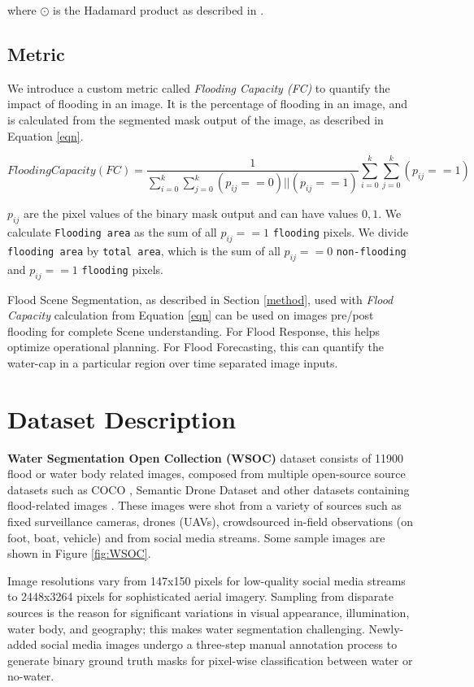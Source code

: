 \documentclass{article}
\begin{document}
where $\odot$ is the Hadamard product as described in \cite{zhang2021transfuse}.  

\subsection{Metric}
We introduce a custom metric called \textit{Flooding Capacity (FC)} to quantify the impact of flooding in an image. It is the percentage of flooding in an image, and is calculated from the segmented mask output of the image, as described in Equation \ref{eqn}. 

\begin{equation}
Flooding Capacity (FC) =\frac{1}{\sum_{i=0}^{k} \sum_{j=0}^{k} (p_{i j}==0) || (p_{ij}==1)} \sum_{i=0}^{k} \sum_{j=0}^{k} (p_{i j}==1)
\label{eqn}
\end{equation}

$ p_{ij}$ are the pixel values of the binary mask output and can have values ${0,1}$. We calculate \verb|Flooding area| as the sum of all $ p_{ij} == 1$ \verb|flooding| pixels. We divide \verb|flooding area| by \verb|total area|, which is the sum of all $ p_{ij} == 0 $ \verb|non-flooding| and $ p_{ij} == 1 $ \verb|flooding| pixels. 

Flood Scene Segmentation, as described in Section \ref{method}, used with \textit{Flood Capacity} calculation from Equation \ref{eqn} can be used on images pre/post flooding for complete Scene understanding. For Flood Response, this helps optimize operational planning. For Flood Forecasting, this can quantify the water-cap in a particular region over time separated image inputs.



\section{Dataset Description}
\textbf{Water Segmentation Open Collection (WSOC)} dataset \cite{wsoc} consists of 11900 flood or water body related images, composed from multiple open-source source datasets such as COCO \cite{coco}, Semantic Drone Dataset \cite{semantic-drone} and other datasets containing flood-related images \cite{wsoc}. These images were shot from a variety of sources such as fixed surveillance cameras, drones (UAVs), crowdsourced in-field observations (on foot, boat, vehicle) and from social media streams. Some sample images are shown in Figure \ref{fig:WSOC}. 

Image resolutions vary from 147x150 pixels for low-quality social media streams to 2448x3264 pixels for sophisticated aerial imagery. 
Sampling from disparate sources is the reason for significant variations in visual appearance, illumination, water body, and geography; this makes water segmentation challenging. Newly-added social media images undergo a three-step manual annotation process to generate binary ground truth masks for pixel-wise classification between water or no-water. 
\end{document}
